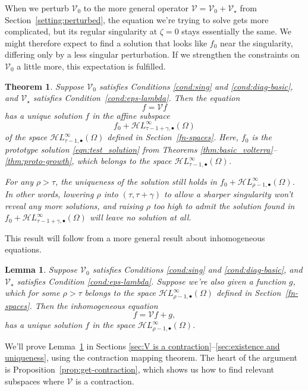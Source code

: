 \documentclass{article}
\theoremstyle{definition}
\theoremstyle{plain}
\newtheorem{lemma}{Lemma}
\newtheorem{thm}{Theorem}
\newcommand{\singexp}[2]{\mathcal{H}L^\infty_{#1, #2}}
\newcommand{\singexpalg}[1]{\singexp{#1}{\bullet}}
\newcommand{\volterra}{\mathcal{V}}
\newcommand{\hardpart}{\mathcal{V}_0}
\newcommand{\softpart}{\mathcal{V}_\star}
\newcommand{\solproto}{f_0}
\newcommand{\domain}{\Omega}
\begin{document}
When we perturb $\hardpart$ to the more general operator $\volterra = \hardpart + \softpart$ from Section~\ref{setting:perturbed}, the equation we're trying to solve gets more complicated, but its regular singularity at $\zeta = 0$ stays essentially the same. We might therefore expect to find a solution that looks like $\solproto$ near the singularity, differing only by a less singular perturbation. If we strengthen the constraints on $\hardpart$ a little more, this expectation is fulfilled.
\begin{thm}\label{thm:general_volterra}
Suppose $\hardpart$ satisfies {\em Conditions \eqref{cond:sing}} and \eqref{cond:diag-basic}, and $\softpart$ satisfies {\em Condition~\eqref{cond:eps-lambda}}. Then the equation
\[f = \volterra f\]
has a unique solution $f$ in the affine subspace
\[ f_0 + \singexpalg{\tau-1+\gamma}(\Omega) \]
of the space $\singexpalg{\tau-1}(\Omega)$ defined in Section~\ref{fn-spaces}. Here, $f_0$ is the prototype solution \eqref{eqn:test_solution} from Theorems \ref{thm:basic_volterra}--\ref{thm:proto-growth}, which belongs to the space $\singexpalg{\tau-1}(\domain)$.

For any $\rho > \tau$, the uniqueness of the solution still holds in $f_0 + \singexpalg{\rho-1}(\Omega)$. In other words, lowering $\rho$ into $(\tau, \tau+\gamma)$ to allow a sharper singularity won't reveal any more solutions, and raising $\rho$ too high to admit the solution found in $f_0 + \singexpalg{\tau-1+\gamma}(\Omega)$ will leave no solution at all.
\end{thm}
This result will follow from a more general result about inhomogeneous equations.
\begin{lemma}\label{lem:perturbed_volterra}
Suppose $\hardpart$ satisfies {\em Conditions \eqref{cond:sing}} and \eqref{cond:diag-basic}, and $\softpart$ satisfies {\em Condition \eqref{cond:eps-lambda}}. Suppose we're also given a function $g$, which for some $\rho > \tau$ belongs to the space $\singexpalg{\rho-1}(\Omega)$ defined in Section~\ref{fn-spaces}. Then the inhomogeneous equation
\[ f = \volterra f + g, \]
has a unique solution $f$ in the space $\singexpalg{\rho-1}(\Omega)$.
\end{lemma}
We'll prove Lemma~\ref{lem:perturbed_volterra} in Sections \ref{sec:V is a contraction}--\ref{sec:existence and uniqueness}, using the contraction mapping theorem. The heart of the argument is Proposition~\ref{prop:get-contraction}, which shows us how to find relevant subspaces where $\volterra$ is a contraction.
\end{document}
